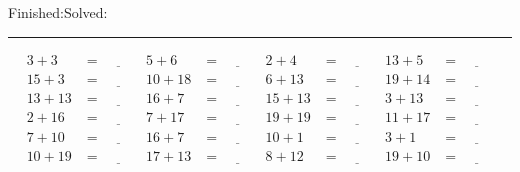 \documentclass{article}
\begin{document}
\begin{sloppy}
\begin{center}
{\selectfont {Started:}\underline{\hspace{1.5cm}}{Finished:}\underline{\hspace{1.5cm}}{Solved:}\underline{\hspace{1.5cm}}}
\end{center}
\hrule
\begin{align*}
    {3} + {3} &= \underline{\hspace{1cm}} & {5} + {6} &= \underline{\hspace{1cm}} & {2} + {4} &= \underline{\hspace{1cm}} & {13} + {5} &= \underline{\hspace{1cm}} \\
    {15} + {3} &= \underline{\hspace{1cm}} & {10} + {18} &= \underline{\hspace{1cm}} & {6} + {13} &= \underline{\hspace{1cm}} & {19} + {14} &= \underline{\hspace{1cm}} \\
    {13} + {13} &= \underline{\hspace{1cm}} & {16} + {7} &= \underline{\hspace{1cm}} & {15} + {13} &= \underline{\hspace{1cm}} & {3} + {13} &= \underline{\hspace{1cm}} \\
    {2} + {16} &= \underline{\hspace{1cm}} & {7} + {17} &= \underline{\hspace{1cm}} & {19} + {19} &= \underline{\hspace{1cm}} & {11} + {17} &= \underline{\hspace{1cm}} \\
    {7} + {10} &= \underline{\hspace{1cm}} & {16} + {7} &= \underline{\hspace{1cm}} & {10} + {1} &= \underline{\hspace{1cm}} & {3} + {1} &= \underline{\hspace{1cm}} \\
    {10} + {19} &= \underline{\hspace{1cm}} & {17} + {13} &= \underline{\hspace{1cm}} & {8} + {12} &= \underline{\hspace{1cm}} & {19} + {10} &= \underline{\hspace{1cm}} \\

\end{align*}
\end{sloppy}
\end{document}
